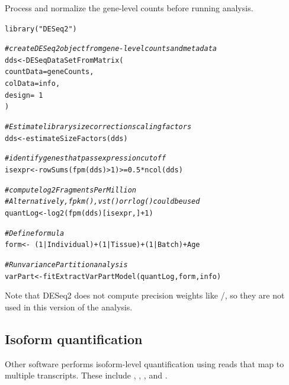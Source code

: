 \documentclass[12pt]{article}\usepackage[]{graphicx}\usepackage[]{xcolor}
\newcommand{\hlnum}[1]{\textcolor[rgb]{0.816,0.125,0.439}{#1}}%
\newcommand{\hlstr}[1]{\textcolor[rgb]{0.251,0.627,0.251}{#1}}%
\newcommand{\hlcom}[1]{\textcolor[rgb]{0.502,0.502,0.502}{\textit{#1}}}%
\newcommand{\hlopt}[1]{\textcolor[rgb]{0,0,0}{#1}}%
\newcommand{\hlstd}[1]{\textcolor[rgb]{0.251,0.251,0.251}{#1}}%
\newcommand{\hlkwb}[1]{\textcolor[rgb]{0,0,0}{#1}}%
\newcommand{\hlkwc}[1]{\textcolor[rgb]{0.251,0.251,0.251}{#1}}%
\newcommand{\hlkwd}[1]{\textcolor[rgb]{0.878,0.439,0.125}{#1}}%
\newenvironment{knitrout}{}{} %
\begin{document}
\subsubsection{}

Process and normalize the gene-level counts before running  analysis.
\begin{knitrout}
\color{fgcolor}\begin{kframe}
\begin{alltt}
\hlkwd{library}\hlstd{(}\hlstr{"DESeq2"}\hlstd{)}

\hlcom{# create DESeq2 object from gene-level counts and metadata}
\hlstd{dds} \hlkwb{<-} \hlkwd{DESeqDataSetFromMatrix}\hlstd{(}
  \hlkwc{countData} \hlstd{= geneCounts,}
  \hlkwc{colData} \hlstd{= info,}
  \hlkwc{design} \hlstd{=} \hlopt{~}\hlnum{1}
\hlstd{)}

\hlcom{# Estimate library size correction scaling factors}
\hlstd{dds} \hlkwb{<-} \hlkwd{estimateSizeFactors}\hlstd{(dds)}

\hlcom{# identify genes that pass expression cutoff}
\hlstd{isexpr} \hlkwb{<-} \hlkwd{rowSums}\hlstd{(}\hlkwd{fpm}\hlstd{(dds)} \hlopt{>} \hlnum{1}\hlstd{)} \hlopt{>=} \hlnum{0.5} \hlopt{*} \hlkwd{ncol}\hlstd{(dds)}

\hlcom{# compute log2 Fragments Per Million}
\hlcom{# Alternatively, fpkm(), vst() or rlog() could be used}
\hlstd{quantLog} \hlkwb{<-} \hlkwd{log2}\hlstd{(}\hlkwd{fpm}\hlstd{(dds)[isexpr, ]} \hlopt{+} \hlnum{1}\hlstd{)}

\hlcom{# Define formula}
\hlstd{form} \hlkwb{<-} \hlopt{~} \hlstd{(}\hlnum{1} \hlopt{|} \hlstd{Individual)} \hlopt{+} \hlstd{(}\hlnum{1} \hlopt{|} \hlstd{Tissue)} \hlopt{+} \hlstd{(}\hlnum{1} \hlopt{|} \hlstd{Batch)} \hlopt{+} \hlstd{Age}

\hlcom{# Run variancePartition analysis}
\hlstd{varPart} \hlkwb{<-} \hlkwd{fitExtractVarPartModel}\hlstd{(quantLog, form, info)}
\end{alltt}
\end{kframe}
\end{knitrout}

Note that DESeq2 does not compute precision weights like /, so they are not used in this version of the analysis.

\subsection{Isoform quantification}
	Other software performs isoform-level quantification using reads that map to multiple transcripts.  These include  \cite{Bray2015},  \cite{Patro2014},  \cite{Patro2015},  \cite{Li2011f} and  \cite{Trapnell2010}.
\end{document}

